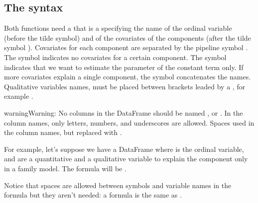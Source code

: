 \documentclass[letterpaper,10pt,english]{sphinxmanual}
\begin{document}
\subsection{The  syntax}
\label{\detokenize{manual:the-formula-syntax}}
\sphinxAtStartPar
Both functions need a  that is a  specifying the name of the ordinal
variable (before the tilde \sphinxcode{\sphinxupquote{\textasciitilde{}}} symbol)
and of the covariates of the components (after the tilde symbol \sphinxcode{\sphinxupquote{\textasciitilde{}}}).
Covariates for each component are
separated by the pipeline symbol \sphinxcode{\sphinxupquote{|}}.
The  symbol  indicates no covariates for a certain component.
The  symbol  indicates that we want to estimate the parameter of the constant term only.
If more covariates explain a single component, the symbol \sphinxcode{\sphinxupquote{+}} concatenates the names.
Qualitative variables names, must be placed between brackets \sphinxcode{\sphinxupquote{()}} leaded by a ,
for example .

\begin{sphinxadmonition}{warning}{Warning:}
\sphinxAtStartPar
No columns in the DataFrame should be named ,  or .
In the column names, only letters, numbers, and underscores \sphinxcode{\sphinxupquote{\_}} are allowed.
Spaces  used in the column names, but replaced with \sphinxcode{\sphinxupquote{\_}}.
\end{sphinxadmonition}

\sphinxAtStartPar
For example, let’s suppose we have a DataFrame where  is the ordinal variable,
 and  are a quantitative and a qualitative variable to explain the  component
only in a  family model. The formula will be .

\sphinxAtStartPar
Notice that spaces are allowed between symbols and variable names in the formula but they aren’t
needed: a formula  is the same as .
\end{document}
